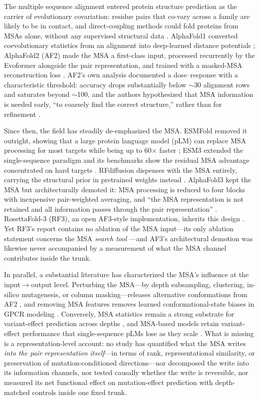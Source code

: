 \documentclass[11pt]{article}
\begin{document}
The multiple sequence alignment entered protein structure prediction as the
carrier of evolutionary covariation: residue pairs that co-vary across a
family are likely to be in contact, and direct-coupling methods could fold
proteins from MSAs alone, without any supervised structural data
\cite{marks2012,ahdritz2024}. AlphaFold1 converted coevolutionary statistics
from an alignment into deep-learned distance potentials \cite{senior2020};
AlphaFold2 (AF2) made the MSA a first-class
input, processed recurrently by the Evoformer alongside the pair
representation, and trained with a masked-MSA reconstruction loss
\cite{jumper2021}. AF2's own analysis documented a dose--response with a
characteristic threshold: accuracy drops substantially below $\sim$30
alignment rows and saturates beyond $\sim$100, and the authors hypothesized
that MSA information is needed early, ``to coarsely find the correct
structure,'' rather than for refinement \cite{jumper2021}.

Since then, the field has steadily de-emphasized the MSA. ESMFold removed it
outright, showing that a large protein language model (pLM) can replace MSA
processing for most targets while being up to 60$\times$ faster
\cite{lin2022}; ESM3 extended the single-sequence paradigm and its benchmarks
show the residual MSA advantage concentrated on hard targets \cite{hayes2024}.
RFdiffusion dispenses with the MSA entirely, carrying the structural prior in
pretrained weights instead \cite{watson2023}.
AlphaFold3 kept the MSA but architecturally demoted it: MSA processing is
reduced to four blocks with inexpensive pair-weighted averaging, and ``the MSA
representation is not retained and all information passes through the pair
representation'' \cite{abramson2024}. RosettaFold-3 (RF3), an open AF3-style
implementation, inherits this design \cite{corley2025}. Yet RF3's report
contains no ablation of the MSA input---its only ablation statement concerns
the MSA \emph{search tool} \cite{corley2025}---and AF3's architectural
demotion was likewise never accompanied by a measurement of what the MSA
channel contributes inside the trunk.

In parallel, a substantial literature has characterized the MSA's influence at
the input$\to$output level. Perturbing the MSA---by depth subsampling,
clustering, in-silico mutagenesis, or column masking---releases alternative
conformations from AF2 \cite{delalamo2022,waymentsteele2024,stein2022,kalakoti2025},
and removing MSA features removes learned conformational-state biases in GPCR
modeling \cite{sala2023,heo2022}. Conversely, MSA statistics remain a strong
substrate for variant-effect prediction across depths \cite{notin2023}, and
MSA-based models retain variant-effect performance that single-sequence pLMs
lose as they scale \cite{akiyama2025}. What is missing is a representation-level
account: no study has quantified what the MSA writes \emph{into the pair
representation itself}---in terms of rank, representational similarity, or
preservation of mutation-conditioned directions---nor decomposed the write
into its information channels, nor tested causally whether the write is
reversible, nor measured its net functional effect on mutation-effect
prediction with depth-matched controls inside one fixed trunk.
\end{document}
